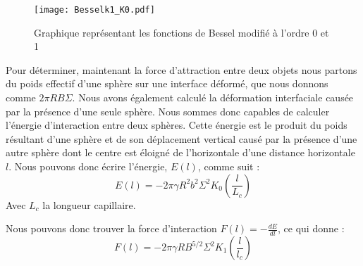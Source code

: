         \begin{figure}[H]
            \centering
            \texttt{[image: Besselk1\_K0.pdf]}
            \caption{Graphique représentant les fonctions de Bessel modifié à l'ordre 0 et 1}
        \end{figure}

        Pour déterminer, maintenant la force d'attraction entre deux objets nous partons du poids effectif d'une sphère sur une interface déformé, que nous donnons comme \(2\pi RB\Sigma\). Nous avons également calculé la déformation interfaciale causée
        par la présence d'une seule sphère. Nous sommes donc capables de calculer l'énergie d'interaction entre deux sphères. Cette énergie est le produit du poids résultant d'une sphère et de son déplacement vertical causé par la présence d'une autre sphère dont le centre est éloigné de l'horizontale d'une distance horizontale $l$. Nous pouvons donc écrire l'énergie, $E(l)$, comme suit :
        \begin{equation}
            E(l)=-2\pi\gamma R^2b^2\Sigma^2K_0\left(\frac{l}{L_c}\right)
            \label{eq:energyInteraction}
        \end{equation}
        Avec $L_c$ la longueur capillaire.

        Nous pouvons donc trouver la force d'interaction $F(l)=-\frac{dE}{dl}$, ce qui donne :
        \begin{equation}
            \boxed{
                F(l)=-2\pi\gamma RB^{5/2}\Sigma^2K_1\left(\frac{l}{l_c}\right)
            }
            \label{eq:ForceInteraction}
        \end{equation}

        
        


